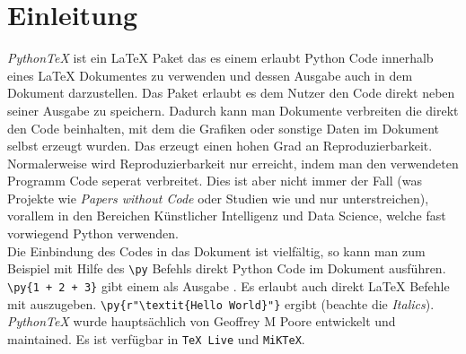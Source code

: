 \documentclass[11pt,a4paper]{article}
\newcommand{\pythontex}{\textit{Python\TeX{}}}
\begin{document}
\section{Einleitung}
\pythontex{} \cite{pythontex-paper} ist ein \LaTeX{} Paket das es einem erlaubt Python Code innerhalb eines \LaTeX{} Dokumentes zu verwenden und dessen Ausgabe auch in dem Dokument darzustellen.
%
Das Paket erlaubt es dem Nutzer den Code direkt neben seiner Ausgabe zu speichern.
%
Dadurch kann man Dokumente verbreiten die direkt den Code beinhalten, mit dem die Grafiken oder sonstige Daten im Dokument selbst erzeugt wurden.
%
Das erzeugt einen hohen Grad an Reproduzierbarkeit.
%
Normalerweise wird Reproduzierbarkeit nur erreicht, indem man den verwendeten Programm Code seperat verbreitet.
%
Dies ist aber nicht immer der Fall (was Projekte wie \emph{Papers without Code}\cite{paperswithoutcode} oder Studien wie \cite{reproducible-study} und \cite{StateofReproducible} nur unterstreichen), vorallem in den Bereichen Künstlicher Intelligenz und Data Science, welche fast vorwiegend Python verwenden.
\\
%
Die Einbindung des Codes in das Dokument ist vielfältig, so kann man zum Beispiel mit Hilfe des \verb+\py+ Befehls direkt Python Code im Dokument ausführen.
%
\verb#\py{1 + 2 + 3}# gibt einem als Ausgabe \texttt{}. Es erlaubt auch direkt \LaTeX{} Befehle mit auszugeben.
%
\verb#\py{r"\textit{Hello World}"}# ergibt  (beachte die \textit{Italics}).
%
\\
%
\pythontex{} wurde hauptsächlich von Geoffrey M Poore entwickelt und maintained.
%
Es ist verfügbar in \texttt{\TeX{} Live} und \texttt{MiK\TeX{}}.
%
\end{document}
